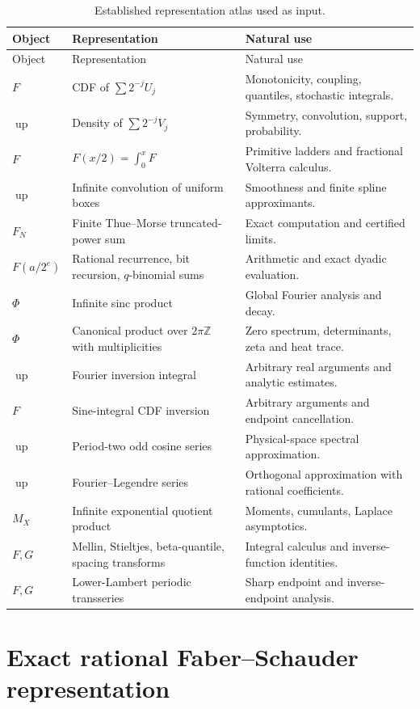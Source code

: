 \documentclass[11pt,oneside]{article}
\theoremstyle{definition}
\newcommand{\Z}{\mathbb Z}
\newcommand{\Up}{\operatorname{up}}
\begin{document}
\begin{longtable}{@{}p{}p{}p{}@{}}
\caption{Established representation atlas used as input.}\label{p5:tab:atlas}\\
\toprule
Object & Representation & Natural use \\
\midrule
\endfirsthead
\toprule
Object & Representation & Natural use \\
\midrule
\endhead
$F$ & CDF of $\sum2^{-j}U_j$ & Monotonicity, coupling, quantiles, stochastic integrals.\\
$\Up$ & Density of $\sum2^{-j}V_j$ & Symmetry, convolution, support, probability.\\
$F$ & $F(x/2)=\int_0^xF$ & Primitive ladders and fractional Volterra calculus.\\
$\Up$ & Infinite convolution of uniform boxes & Smoothness and finite spline approximants.\\
$F_N$ & Finite Thue--Morse truncated-power sum & Exact computation and certified limits.\\
$F(a/2^e)$ & Rational recurrence, bit recursion, $q$-binomial sums & Arithmetic and exact dyadic evaluation.\\
$\Phi$ & Infinite sinc product & Global Fourier analysis and decay.\\
$\Phi$ & Canonical product over $2\pi\Z$ with multiplicities & Zero spectrum, determinants, zeta and heat trace.\\
$\Up$ & Fourier inversion integral & Arbitrary real arguments and analytic estimates.\\
$F$ & Sine-integral CDF inversion & Arbitrary arguments and endpoint cancellation.\\
$\Up$ & Period-two odd cosine series & Physical-space spectral approximation.\\
$\Up$ & Fourier--Legendre series & Orthogonal approximation with rational coefficients.\\
$M_X$ & Infinite exponential quotient product & Moments, cumulants, Laplace asymptotics.\\
$F,G$ & Mellin, Stieltjes, beta-quantile, spacing transforms & Integral calculus and inverse-function identities.\\
$F,G$ & Lower-Lambert periodic transseries & Sharp endpoint and inverse-endpoint analysis.\\
\bottomrule
\end{longtable}

\section{Exact rational Faber--Schauder representation}
\label{p5:sec:faber}
\end{document}
